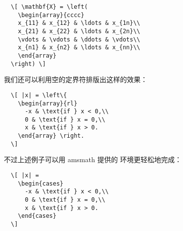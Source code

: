 \begin{lstlisting}
  \[ \mathbf{X} = \left(
    \begin{array}{cccc}
    x_{11} & x_{12} & \ldots & x_{1n}\\
    x_{21} & x_{22} & \ldots & x_{2n}\\
    \vdots & \vdots & \ddots & \vdots\\
    x_{n1} & x_{n2} & \ldots & x_{nn}\\
    \end{array} 
  \right) \]
\end{lstlisting}
\begin{center}
	\fbox{
		\parbox{25em}{
			\[ \mathbf{X} = \left(
			\begin{array}{cccc}
			x_{11} & x_{12} & \ldots & x_{1n}\\
			x_{21} & x_{22} & \ldots & x_{2n}\\
			\vdots & \vdots & \ddots & \vdots\\
			x_{n1} & x_{n2} & \ldots & x_{nn}\\
			\end{array} 
			\right) \]
		}
	}
\end{center}
我们还可以利用空的定界符排版出这样的效果：
\begin{lstlisting}
  \[ |x| = \left\{
    \begin{array}{rl}
      -x & \text{if } x < 0,\\
      0 & \text{if } x = 0,\\
      x & \text{if } x > 0.
    \end{array} \right. 
  \]
\end{lstlisting}
\begin{center}
	\fbox{
		\parbox{25em}{
			\[ |x| = \left\{
			\begin{array}{rl}
			-x & \text{if } x < 0,\\
			0 & \text{if } x = 0,\\
			x & \text{if } x > 0.
			\end{array} \right. 
			\]
		}
	}
\end{center}
不过上述例子可以用 amsmath 提供的  环境更轻松地完成：
\begin{lstlisting}
  \[ |x| =
    \begin{cases}
      -x & \text{if } x < 0,\\
      0 & \text{if } x = 0,\\
      x & \text{if } x > 0.
    \end{cases} 
  \]
\end{lstlisting}
